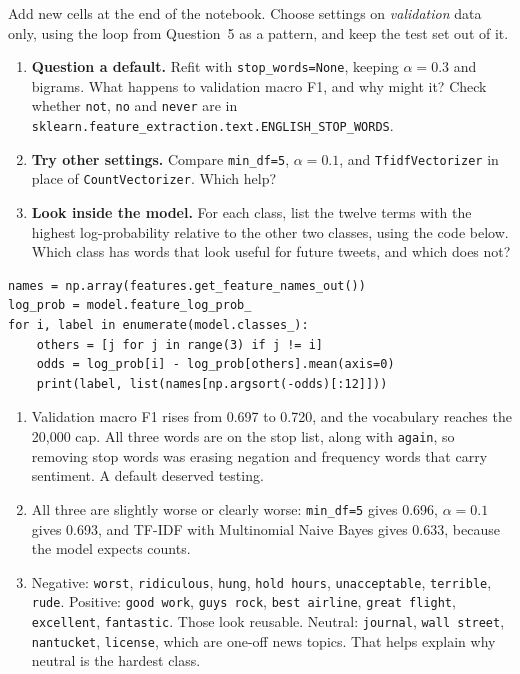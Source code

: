 \begin{yourturn}
Add new cells at the end of the notebook. Choose settings on \emph{validation} data only, using the loop from Question~5 as a pattern, and keep the test set out of it.
\begin{enumerate}
  \item \textbf{Question a default.} Refit with \texttt{stop\_words=None}, keeping $\alpha=0.3$ and bigrams. What happens to validation macro F1, and why might it? Check whether \texttt{not}, \texttt{no} and \texttt{never} are in \texttt{sklearn.feature\_extraction.text.ENGLISH\_STOP\_WORDS}.
  \item \textbf{Try other settings.} Compare \texttt{min\_df=5}, $\alpha=0.1$, and \texttt{TfidfVectorizer} in place of \texttt{CountVectorizer}. Which help?
  \item \textbf{Look inside the model.} For each class, list the twelve terms with the highest log-probability relative to the other two classes, using the code below. Which class has words that look useful for future tweets, and which does not?
\end{enumerate}
\begin{lstlisting}[style=utppython]
names = np.array(features.get_feature_names_out())
log_prob = model.feature_log_prob_
for i, label in enumerate(model.classes_):
    others = [j for j in range(3) if j != i]
    odds = log_prob[i] - log_prob[others].mean(axis=0)
    print(label, list(names[np.argsort(-odds)[:12]]))
\end{lstlisting}
\end{yourturn}

\begin{expectedfindings}
\begin{enumerate}
  \item Validation macro F1 rises from 0.697 to 0.720, and the vocabulary reaches the 20,000 cap. All three words are on the stop list, along with \texttt{again}, so removing stop words was erasing negation and frequency words that carry sentiment. A default deserved testing.
  \item All three are slightly worse or clearly worse: \texttt{min\_df=5} gives 0.696, $\alpha=0.1$ gives 0.693, and TF-IDF with Multinomial Naive Bayes gives 0.633, because the model expects counts.
  \item Negative: \texttt{worst}, \texttt{ridiculous}, \texttt{hung}, \texttt{hold hours}, \texttt{unacceptable}, \texttt{terrible}, \texttt{rude}. Positive: \texttt{good work}, \texttt{guys rock}, \texttt{best airline}, \texttt{great flight}, \texttt{excellent}, \texttt{fantastic}. Those look reusable. Neutral: \texttt{journal}, \texttt{wall street}, \texttt{nantucket}, \texttt{license}, which are one-off news topics. That helps explain why neutral is the hardest class.
\end{enumerate}
\end{expectedfindings}

